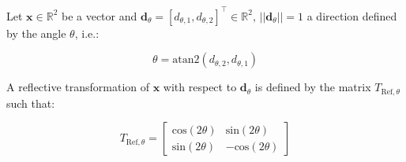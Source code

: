 



    

\begin{definition}
    Let $\mathbf{x}\in\mathbb{R}^2$ be a vector and $\mathbf{d}_\theta = [d_{\theta,1},d_{\theta,2}]^\top \in \mathbb{R}^2,\,||\mathbf{d}_\theta||=1$ a direction defined by the angle $\theta$, i.e.:

    \begin{equation}
        \theta = \mathrm{atan2}(d_{\theta,2},d_{\theta,1})
    \end{equation}

    A reflective transformation of $\mathbf{x}$ with respect to $\mathbf{d}_\theta$ is defined by the matrix $T_{\mathrm{Ref},\theta}$ such that:

\begin{equation}
    T_{\mathrm{Ref},\theta} = \begin{bmatrix}
        \mathrm{cos}(2\theta) & \mathrm{sin}(2\theta) \\
        \mathrm{sin}(2\theta) & -\mathrm{cos}(2\theta)
    \end{bmatrix}
\end{equation}

\end{definition}




